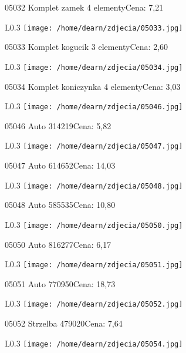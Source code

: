 05032 Komplet zamek 4 elementyCena: 7,21\newline
\begin{wrapfigure}{L}{0.3\textwidth}
\texttt{[image: /home/dearn/zdjecia/05033.jpg]}
\end{wrapfigure}
05033 Komplet kogucik 3 elementyCena: 2,60\newline
\begin{wrapfigure}{L}{0.3\textwidth}
\texttt{[image: /home/dearn/zdjecia/05034.jpg]}
\end{wrapfigure}
05034 Komplet koniczynka 4 elementyCena: 3,03\newline
\begin{wrapfigure}{L}{0.3\textwidth}
\texttt{[image: /home/dearn/zdjecia/05046.jpg]}
\end{wrapfigure}
05046 Auto            314219Cena: 5,82\newline
\begin{wrapfigure}{L}{0.3\textwidth}
\texttt{[image: /home/dearn/zdjecia/05047.jpg]}
\end{wrapfigure}
05047 Auto                      614652Cena: 14,03\newline
\begin{wrapfigure}{L}{0.3\textwidth}
\texttt{[image: /home/dearn/zdjecia/05048.jpg]}
\end{wrapfigure}
05048 Auto      585535Cena: 10,80\newline
\begin{wrapfigure}{L}{0.3\textwidth}
\texttt{[image: /home/dearn/zdjecia/05050.jpg]}
\end{wrapfigure}
05050 Auto     816277Cena: 6,17\newline
\begin{wrapfigure}{L}{0.3\textwidth}
\texttt{[image: /home/dearn/zdjecia/05051.jpg]}
\end{wrapfigure}
05051 Auto    770950Cena: 18,73\newline
\begin{wrapfigure}{L}{0.3\textwidth}
\texttt{[image: /home/dearn/zdjecia/05052.jpg]}
\end{wrapfigure}
05052 Strzelba      479020Cena: 7,64\newline
\begin{wrapfigure}{L}{0.3\textwidth}
\texttt{[image: /home/dearn/zdjecia/05054.jpg]}
\end{wrapfigure}

